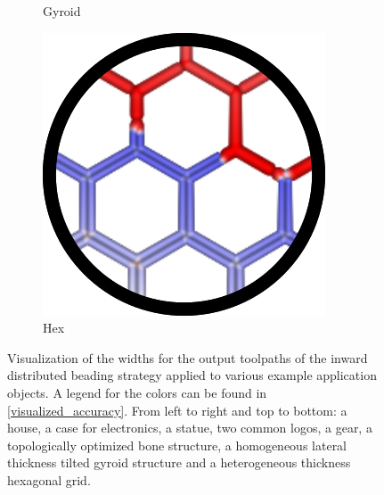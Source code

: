 \begin{figure}
\begin{subfigure}{\figwidth}
\caption{Gyroid}\label{applications_gyroid}
\end{subfigure}
\begin{subfigure}{\figwidth}\centering
\includegraphics[height=\figheight]{sources/applications/hex_grid.png}
\caption{Hex}\label{applications_hex}
\end{subfigure}
\caption{
Visualization of the widths for the output toolpaths of the inward distributed beading strategy applied to various example application objects.
A legend for the colors can be found in \cref{visualized_accuracy}.
From left to right and top to bottom: a house, a case for electronics, a statue, two common logos, a gear, a topologically optimized bone structure, a homogeneous lateral thickness tilted gyroid structure and a heterogeneous thickness hexagonal grid.
}
\label{applications_overview}
\end{figure}




